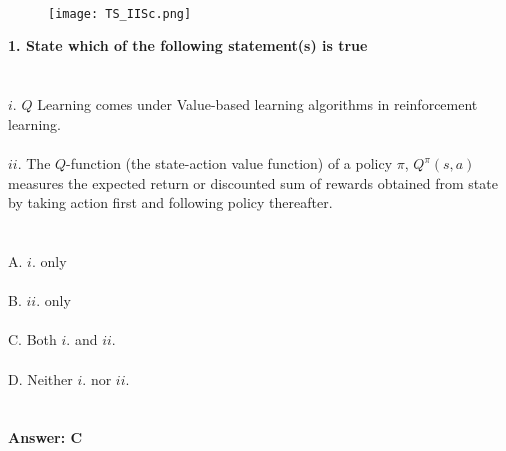 \documentclass[prl,twocolumn,showpacs,preprintnumbers,superscriptaddress]{revtex4}
\theoremstyle{plain}
\theoremstyle{definition}
\begin{document}
\begin{widetext}
\\
\\
\\

\begin{wrapfigure}
\centering
\end{wrapfigure}
\begin{figure}[h!]
 \begin{right}
  \hfill\texttt{[image: TS\_IISc.png]}
 \end{right}
\end{figure}
\noindent\textbf{1. State which of the following statement(s) is true}%
\\
\\
\\
$i.$ $Q$ Learning comes under Value-based learning algorithms in reinforcement learning. 
\\
\\
$ii.$ The $Q$-function (the state-action value function) of a policy $\pi$, $Q^{\pi}(s,a)$ measures the expected return or discounted sum of rewards obtained from state  by taking action  first and following policy  thereafter.
\\
\\
\\
A. $i.$ only
\\
\\
B. $ii.$ only
\\
\\
C. Both $i.$ and $ii.$
\\
\\
D. Neither $i.$ nor $ii.$
\\
\\
\\
\textbf{Answer: C}
\\
\\

\end{widetext}
\end{document}
